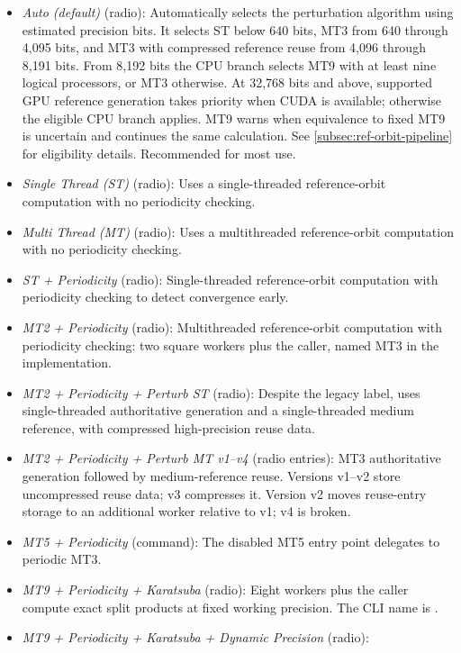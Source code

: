 \begin{itemize}
\begin{itemize}
      \item \emph{Auto (default)} (radio): Automatically selects the perturbation
      algorithm using estimated precision bits. It selects ST below 640 bits,
      MT3 from 640 through 4,095 bits, and MT3 with compressed reference reuse
      from 4,096 through 8,191 bits. From 8,192 bits the CPU branch selects MT9
      with at least nine logical processors, or MT3 otherwise. At 32,768 bits
      and above, supported GPU reference generation takes priority when CUDA
      is available; otherwise the eligible CPU branch applies.
      MT9 warns when equivalence to fixed MT9 is uncertain and continues the same calculation.
      See \cref{subsec:ref-orbit-pipeline} for eligibility details.
      Recommended for most use.
      \item \emph{Single Thread (ST)} (radio): Uses a single-threaded
      reference-orbit computation with no periodicity checking.
      \item \emph{Multi Thread (MT)} (radio): Uses a multithreaded
      reference-orbit computation with no periodicity checking.
      \item \emph{ST + Periodicity} (radio): Single-threaded reference-orbit
      computation with periodicity checking to detect convergence early.
      \item \emph{MT2 + Periodicity} (radio): Multithreaded reference-orbit
      computation with periodicity checking: two square workers plus the caller,
      named MT3 in the implementation.
      \item \emph{MT2 + Periodicity + Perturb ST} (radio): Despite the legacy
      label, uses single-threaded authoritative generation and a single-threaded
      medium reference, with compressed high-precision reuse data.
      \item \emph{MT2 + Periodicity + Perturb MT v1--v4} (radio entries):
      MT3 authoritative generation followed by medium-reference reuse.
      Versions v1--v2 store uncompressed reuse data; v3 compresses it.
      Version v2 moves reuse-entry storage to an additional worker relative to v1;
      v4 is broken.
      \item \emph{MT5 + Periodicity} (command): The disabled MT5 entry point
      delegates to periodic MT3.
      \item \emph{MT9 + Periodicity + Karatsuba} (radio): Eight workers plus
      the caller compute exact split products at fixed working precision.
      The CLI name is .
      \item \emph{MT9 + Periodicity + Karatsuba + Dynamic Precision} (radio):

\end{itemize}
\end{itemize}
